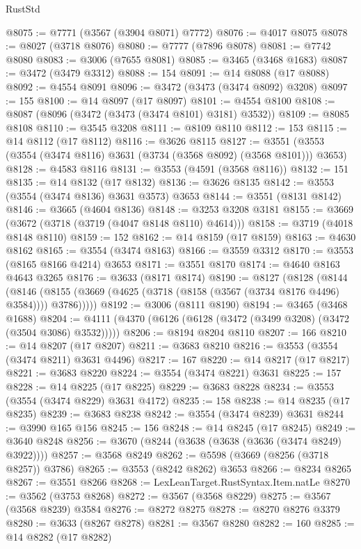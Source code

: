 \begin{lexlean}{RustStd}
\begin{coremodule}
@8075 := @7771 (@3567 (@3904 @8071) @7772)
@8076 := @4017 @8075
@8078 := @8027 (@3718 @8076)
@8080 := @7777 (@7896 @8078)
@8081 := @7742 @8080
@8083 := @3006 (@7655 @8081)
@8085 := @3465 (@3468 @1683)
@8087 := @3472 (@3479 @3312)
@8088 := 154
@8091 := @14 @8088 (@17 @8088)
@8092 := @4554 @8091
@8096 := @3472 (@3473 (@3474 @8092) @3208)
@8097 := 155
@8100 := @14 @8097 (@17 @8097)
@8101 := @4554 @8100
@8108 := @8087 (@8096 (@3472 (@3473 (@3474 @8101) @3181) @3532))
@8109 := @8085 @8108
@8110 := @3545 @3208
@8111 := @8109 @8110
@8112 := 153
@8115 := @14 @8112 (@17 @8112)
@8116 := @3626 @8115
@8127 := @3551 (@3553 (@3554 (@3474 @8116) @3631 (@3734 (@3568 @8092) (@3568 @8101))) @3653)
@8128 := @4583 @8116
@8131 := @3553 (@4591 (@3568 @8116))
@8132 := 151
@8135 := @14 @8132 (@17 @8132)
@8136 := @3626 @8135
@8142 := @3553 (@3554 (@3474 @8136) @3631 @3573) @3653
@8144 := @3551 (@8131 @8142)
@8146 := @3665 (@4604 @8136)
@8148 := @3253 @3208 @3181
@8155 := @3669 (@3672 (@3718 (@3719 (@4047 @8148 @8110) @4614)))
@8158 := @3719 (@4018 @8148 @8110)
@8159 := 152
@8162 := @14 @8159 (@17 @8159)
@8163 := @4630 @8162
@8165 := @3554 (@3474 @8163)
@8166 := @3559 @3312
@8170 := @3553 (@8165 @8166 @4214) @3653
@8171 := @3551 @8170
@8174 := @4640 @8163 @4643 @3265
@8176 := @3633 (@8171 @8174)
@8190 := @8127
    (@8128
      (@8144
        (@8146 (@8155 (@3669 (@4625 (@3718 (@8158 (@3567 (@3734 @8176 @4496) @3584)))) @3786)))))
@8192 := @3006 (@8111 @8190)
@8194 := @3465 (@3468 @1688)
@8204 := @4111 (@4370 (@6126 (@6128 (@3472 (@3499 @3208) (@3472 (@3504 @3086) @3532)))))
@8206 := @8194 @8204 @8110
@8207 := 166
@8210 := @14 @8207 (@17 @8207)
@8211 := @3683 @8210
@8216 := @3553 (@3554 (@3474 @8211) @3631 @4496)
@8217 := 167
@8220 := @14 @8217 (@17 @8217)
@8221 := @3683 @8220
@8224 := @3554 (@3474 @8221) @3631
@8225 := 157
@8228 := @14 @8225 (@17 @8225)
@8229 := @3683 @8228
@8234 := @3553 (@3554 (@3474 @8229) @3631 @4172)
@8235 := 158
@8238 := @14 @8235 (@17 @8235)
@8239 := @3683 @8238
@8242 := @3554 (@3474 @8239) @3631
@8244 := @3990 @165 @156
@8245 := 156
@8248 := @14 @8245 (@17 @8245)
@8249 := @3640 @8248
@8256 := @3670 (@8244 (@3638 (@3638 (@3636 (@3474 @8249) @3922))))
@8257 := @3568 @8249
@8262 := @5598 (@3669 (@8256 (@3718 @8257)) @3786)
@8265 := @3553 (@8242 @8262) @3653
@8266 := @8234 @8265
@8267 := @3551 @8266
@8268 := LexLeanTarget.RustSyntax.Item.natLe
@8270 := @3562 (@3753 @8268)
@8272 := @3567 (@3568 @8229)
@8275 := @3567 (@3568 @8239) @3584
@8276 := @8272 @8275
@8278 := @8270 @8276 @3379
@8280 := @3633 (@8267 @8278)
@8281 := @3567 @8280
@8282 := 160
@8285 := @14 @8282 (@17 @8282)

\end{coremodule}
\end{lexlean}
